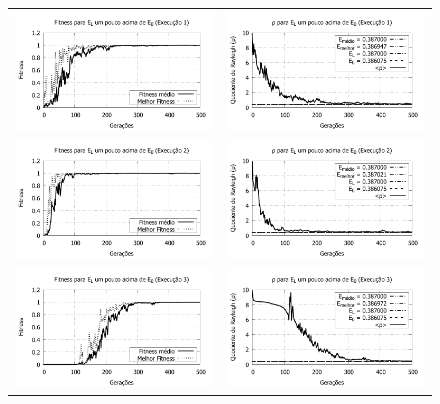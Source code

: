 	\begin{figure}[p]
	\centering
  \begin{tabular}{@{}cc@{}}
    
		\includegraphics[width=.40\textwidth]{figs/resultados/variandoEL/T1E1_fitness.pdf} &
    \includegraphics[width=.40\textwidth]{figs/resultados/variandoEL/T1E1_rho.pdf}   \\
		
		\includegraphics[width=.40\textwidth]{figs/resultados/variandoEL/T1E2_fitness.pdf} &
    \includegraphics[width=.40\textwidth]{figs/resultados/variandoEL/T1E2_rho.pdf}   \\
		
		\includegraphics[width=.40\textwidth]{figs/resultados/variandoEL/T1E3_fitness.pdf} &
    \includegraphics[width=.40\textwidth]{figs/resultados/variandoEL/T1E3_rho.pdf}   \\
		

\end{tabular}
\end{figure}
